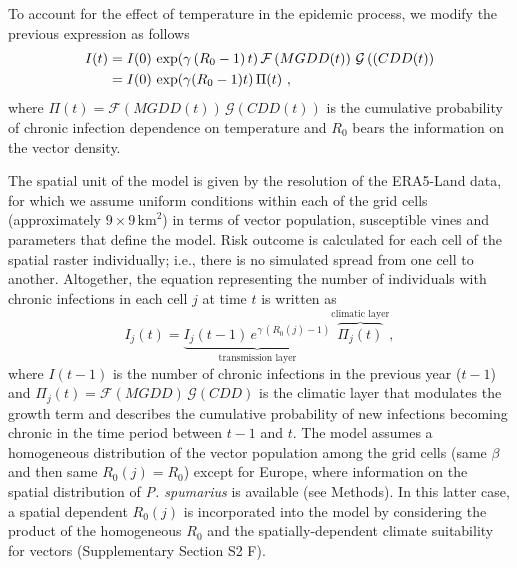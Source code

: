     To account for the effect of temperature in the epidemic process, we modify
    the previous expression as follows
    \begin{align}
        \label{eq:final_eq}
        I(t) & =I(0)\, \exp(\gamma\, (R_0-1)\, t)\,
        \mathcal{F}\left(MGDD(t)\right)\,
        \mathcal{G}\left((CDD(t)\right) \nonumber
        \\
             & =I(0)\, \exp(\gamma(R_0-1)t)\, \Pi(t) \ ,
    \end{align}
    where $\Pi(t)=\mathcal{F}(MGDD(t))\, \mathcal{G}(CDD(t))$ is the cumulative
    probability of chronic infection dependence on temperature and $R_0$ bears
    the
    information on the vector density.

    The spatial unit of the model is given by the resolution of the ERA5-Land
    data, for which we assume uniform conditions within each of the grid cells
    (approximately $9 \times 9\,  \textrm{km}^2$) in terms of vector
    population,
    susceptible vines and parameters that define the model. Risk outcome is
    calculated for each cell of the spatial raster individually; i.e., there is
    no
    simulated spread from one cell to another. Altogether, the equation
    representing the number of individuals with chronic infections in each cell
$j$
    at time $t$ is written as
    \begin{equation}\label{eq:evolution_eq}
        I_j(t)=\underbrace{I_j(t-1) \, e^{\gamma \,
                    (R_0(j)-1)}}_\text{transmission
            layer}	  \overbrace{\Pi_j(t)}^\text{climatic layer} ,
    \end{equation}
    where $I(t-1)$ is the number of chronic infections in the previous year
    ($t-1$) and $\Pi_j(t)=\mathcal{F}(MGDD)\, \mathcal{G}(CDD)$ is the climatic
    layer that modulates the growth term and describes the cumulative
    probability
    of new infections becoming chronic in the time period between $t-1$ and
$t$.
    The model assumes a homogeneous distribution of the vector population among
    the
    grid cells (same $\beta$ and then same $R_0(j) = R_0$) except for Europe,
    where
    information on the spatial distribution of \textit{P. spumarius} is
    available
    (see Methods). In this latter case, a spatial dependent $R_0(j)$ is
    incorporated into the model by considering the product of the homogeneous
$R_0$
    and the spatially-dependent climate suitability for vectors (Supplementary
    Section S2 F).

